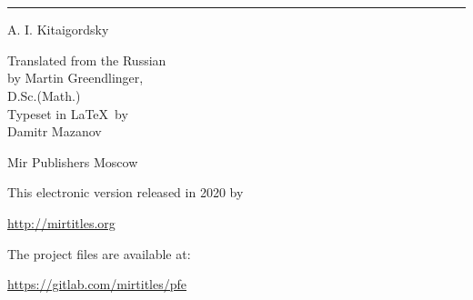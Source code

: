 

\cleardoublepage
\thispagestyle{empty}
\vspace*{1cm}
\begin{center}
\selectfont{\Huge Physics for Everyone} \\[10pt] 
\selectfont{\LARGE Book 3: Electrons} \\[10pt]
\hrule
\vspace{10pt}

{\Large A. I. Kitaigordsky}\\[15pt]
\begin{flushright}
Translated from the Russian \\by Martin Greendlinger,\\
D.Sc.(Math.)\\[15pt]
Typeset in \LaTeX \, by\\ Damitr Mazanov
\end{flushright}
\vspace{4cm}
{\Large Mir Publishers Moscow}
\end{center}
\cleardoublepage

\vfill
\vspace*{1cm}
This electronic version released in 2020 by 

\begin{tiny}
\url{http://mirtitles.org}
\end{tiny}


The project files are available at:

\begin{small}
\url{https://gitlab.com/mirtitles/pfe}
\end{small}

\thispagestyle{empty}
\clearpage